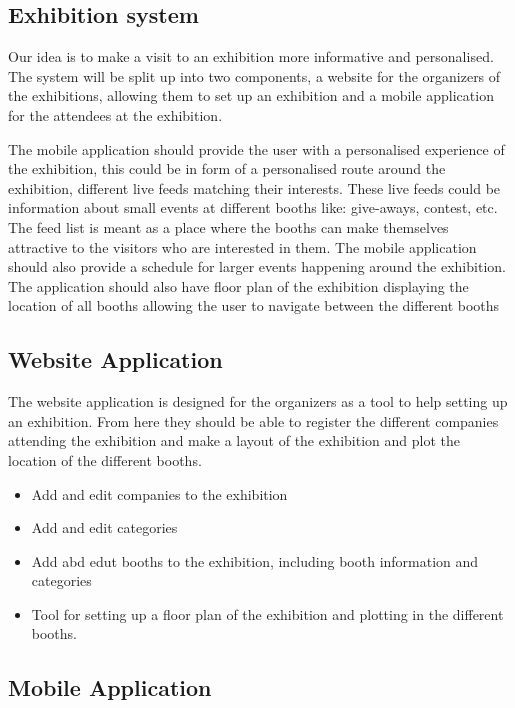 \subsection*{Exhibition system}

Our idea is to make a visit to an exhibition more informative and personalised. The system will be split up into two components, a website for the organizers of the exhibitions, allowing them to set up an exhibition and a mobile application for the attendees at the exhibition.

The mobile application should provide the user with a personalised experience of the exhibition, this could be in form of a personalised route around the exhibition, different live feeds matching their interests. These live feeds could be information about small events at different booths like: give-aways, contest, etc. The feed list is meant as a place where the booths can make themselves attractive to the visitors who are interested in them. The mobile application should also provide a schedule for larger events happening around the exhibition. The application should also have floor plan of the exhibition displaying the location of all booths allowing the user to navigate between the different booths

\subsection*{Website Application}
The website application is designed for the organizers as a tool to help setting up an exhibition. From here they should be able to register the different companies attending the exhibition and make a layout of the exhibition and plot the location of the different booths.
\begin{itemize}
\item Add and edit companies to the exhibition
\item Add and edit categories
\item Add abd edut booths to the exhibition, including booth information and categories
\item Tool for setting up a floor plan of the exhibition and plotting in the different booths.
\end{itemize}
\subsection*{Mobile Application}

